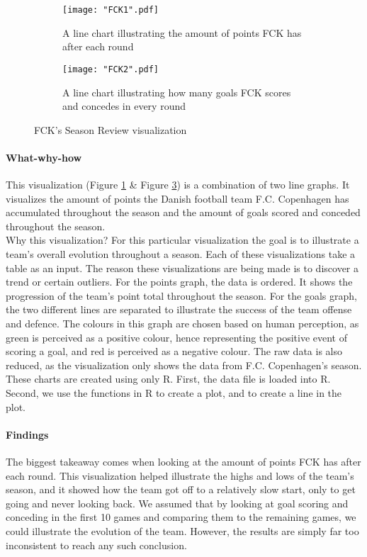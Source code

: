 \documentclass[Report.tex]{subfiles}
\begin{document}
\begin{figure}
\center
\begin{subfigure}[b]{0.8\textwidth}
\texttt{[image: "FCK1".pdf]}
\caption{A line chart illustrating the amount of points FCK has after each round}
\label{Fig:points}
\end{subfigure}

\begin{subfigure}[b]{0.8\textwidth}
\texttt{[image: "FCK2".pdf]}
\caption{A line chart illustrating how many goals FCK scores and concedes in every round}
\label{Fig:fck_goals}
\end{subfigure}
\caption{FCK's Season Review visualization}
\end{figure}


\paragraph{What-why-how\\}
This visualization (Figure \ref{Fig:points} \& Figure \ref{Fig:fck_goals}) is a combination of two line graphs. It visualizes the amount of points the Danish football team F.C. Copenhagen has accumulated throughout the season and the amount of goals scored and conceded throughout the season.\\
Why this visualization? For this particular visualization the goal is to illustrate a team’s overall evolution throughout a season. Each of these visualizations take a table as an input. The reason these visualizations are being made is to discover a trend or certain outliers. For the points graph, the data is ordered. It shows the progression of the team’s point total throughout the season. For the goals graph, the two different lines are separated to illustrate the success of the team offense and defence. The colours in this graph are chosen based on human perception, as green is perceived as a positive colour, hence representing the positive event of scoring a goal, and red is perceived as a negative colour. The raw data is also reduced, as the visualization only shows the data from F.C. Copenhagen’s season.\\
These charts are created using only R. First, the data file is loaded into R. Second, we use the functions in R to create a plot, and to create a line in the plot.
\paragraph{Findings\\}
The biggest takeaway comes when looking at the amount of points FCK has after each round. This visualization helped illustrate the highs and lows of the team’s season, and it showed how the team got off to a relatively slow start, only to get going and never looking back. We assumed that by looking at goal scoring and conceding in the first 10 games and comparing them to the remaining games, we could illustrate the evolution of the team. However, the results are simply far too inconsistent to reach any such conclusion. 
\end{document}
